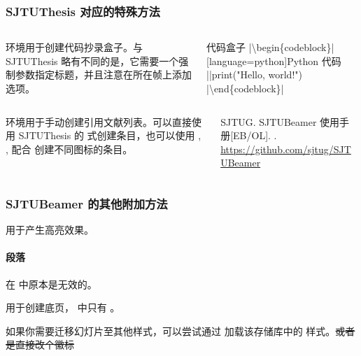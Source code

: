 \begin{frame}[fragile]
  \frametitle{SJTUThesis 对应的特殊方法}
  \begin{columns}
    \begin{column}{0.55\textwidth}
       环境用于创建代码抄录盒子。与 SJTUThesis 略有不同的是，它需要一个强制参数指定标题，并且注意在所在帧上添加  选项。
    \end{column}
    \begin{column}{0.45\textwidth}
      \begin{codeblock}{代码盒子}
|\textbackslash{}begin\{codeblock\}|[language=python]{Python 代码}
|\phantom{}|print("Hello, world!")
|\textbackslash{}end\{codeblock\}|
      \end{codeblock}
    \end{column}
  \end{columns}


  \begin{columns}
    \begin{column}{0.55\textwidth}
       环境用于手动创建引用文献列表。可以直接使用 SJTUThesis 的  式创建条目，也可以使用 , ,  配合  创建不同图标的条目。
    \end{column}
    \begin{column}{0.45\textwidth}
      \begin{bibliolist}{00}
        \onlineitem SJTUG.
        \newblock SJTUBeamer 使用手册[EB/OL].
        . \url{https://github.com/sjtug/SJTUBeamer}
      \end{bibliolist}
    \end{column}
  \end{columns}


\end{frame}

\begin{frame}
  \frametitle{SJTUBeamer 的其他附加方法}
    用于产生高亮效果。
  
  \paragraph{段落}  在  中原本是无效的。

  \vspace*{0.25em}

   用于创建底页， 中只有 。

  \vspace*{1em}

  如果你需要迁移幻灯片至其他样式，可以尝试通过  加载该存储库中的  样式。\sout{或者是直接改个徽标}
\end{frame}

